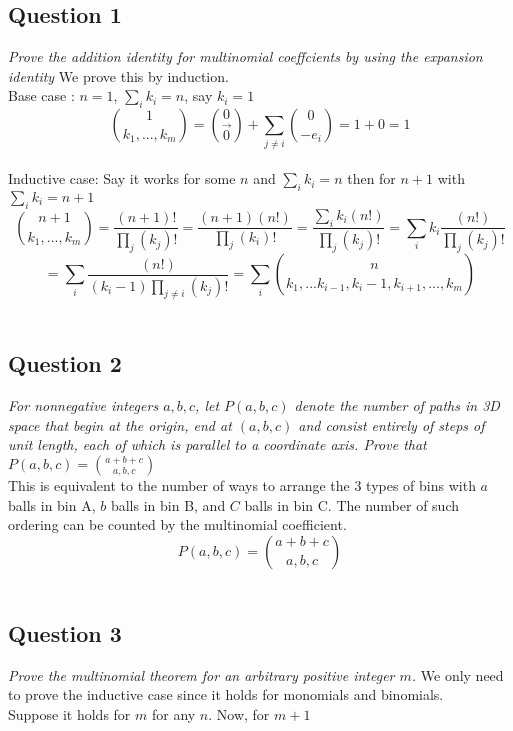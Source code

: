 \documentclass{article}
\begin{document}
\subsection{Question 1}
\smallskip
\emph{Prove the addition identity for multinomial coeffcients by using the expansion identity}
\medskip
We prove this by induction.
\\
Base case : $n = 1$, $\sum_{i} k_i = n$, say $k_i = 1$
$$
{1\choose k_1, ..., k_m} = {0 \choose \vec{0}} + \sum_{j \neq i}{0 \choose -e_i}
= 1 + 0 = 1
$$
\medskip
\\
Inductive case: Say it works for some $n$ and $\sum_{i}k_i = n$ then for $n+1$ with $\sum_{i}k_i = n+1$ 
$$
{n+1\choose k_1, ..., k_m} 
= 
\frac{(n+1)!}{\prod_{j} (k_j)!} 
= 
\frac{(n+1)(n!)}{\prod_{j} (k_i)!} 
= 
\frac{\sum_{i}k_i(n!)}{\prod_{j} (k_j)!}
=
\sum_{i} k_i \frac{(n!)}{\prod_{j} (k_j)!}
$$
$$
=
\sum_{i} \frac{(n!)}{(k_i-1)\prod_{j \neq i} (k_j)!}
=
\sum_{i} {n\choose k_1, ... k_{i-1}, k_{i}-1, k_{i+1}, ..., k_m} 
$$
\bigskip
\\
\subsection{Question 2}
\smallskip
\emph{For nonnegative integers $a, b, c$, let $P(a,b,c)$ denote the number of paths in 3D space that begin at the origin, end at $(a,b,c)$ and consist entirely of steps of unit length, each of which is parallel to a coordinate axis. Prove that $P(a,b,c) = {a+b+c \choose a, b, c}$}
\medskip
\\
This is equivalent to the number of ways to arrange the 3 types of bins with $a$ balls in bin A, $b$ balls in bin B, and $C$ balls in bin C. The number of such ordering can be counted by the multinomial coefficient.
$$
P(a,b,c) = {a+b+c \choose a, b, c}
$$
\bigskip
\\
\subsection{Question 3}
\emph{Prove the multinomial theorem for an arbitrary positive integer $m$.}
\medskip
We only need to prove the inductive case since it holds for monomials and binomials.
\medskip
\\
Suppose it holds for $m$ for any $n$. Now, for $m+1$
\end{document}
